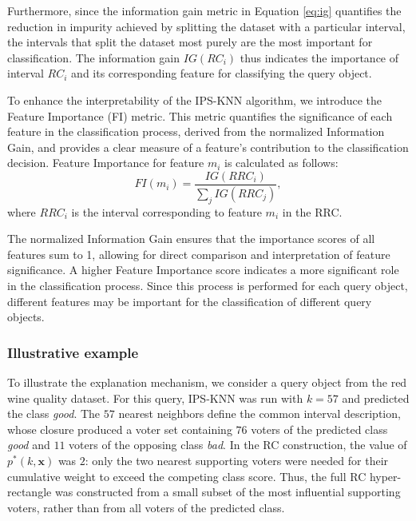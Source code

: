 \documentclass[a4paper,fleqn]{cas-sc}
\begin{document}
Furthermore, since the information gain metric in Equation \ref{eq:ig} quantifies the reduction in impurity achieved by splitting the dataset with a particular interval, the intervals that split the dataset most purely are the most important for classification. The information gain $IG(RC_i)$ thus indicates the importance of interval $RC_i$ and its corresponding feature for classifying the query object.

To enhance the interpretability of the IPS-KNN algorithm, we introduce the Feature Importance (FI) metric. This metric quantifies the significance of each feature in the classification process, derived from the normalized Information Gain, and provides a clear measure of a feature's contribution to the classification decision. Feature Importance for feature $m_i$ is calculated as follows:
\begin{equation}\label{eq:fi}
FI(m_i) = \frac{IG(RRC_i)}{\sum_{j}IG(RRC_j)}
,
\end{equation}
where $RRC_i$ is the interval corresponding to feature $m_i$ in the RRC.

The normalized Information Gain ensures that the importance scores of all features sum to 1, allowing for direct comparison and interpretation of feature significance. A higher Feature Importance score indicates a more significant role in the classification process. Since this process is performed for each query object, different features may be important for the classification of different query objects.

\FloatBarrier
\subsubsection{Illustrative example}\label{sec:illustrative_example}

To illustrate the explanation mechanism, we consider a query object from the red wine quality dataset. For this query, IPS-KNN was run with \(k=57\) and predicted the class \textit{good}. The \(57\) nearest neighbors define the common interval description, whose closure produced a voter set containing \(76\) voters of the predicted class \textit{good} and \(11\) voters of the opposing class \textit{bad}. In the RC construction, the value of \(p^*(k,\mathbf{x})\) was \(2\): only the two nearest supporting voters were needed for their cumulative weight to exceed the competing class score. Thus, the full RC hyper-rectangle was constructed from a small subset of the most influential supporting voters, rather than from all voters of the predicted class.
\end{document}
